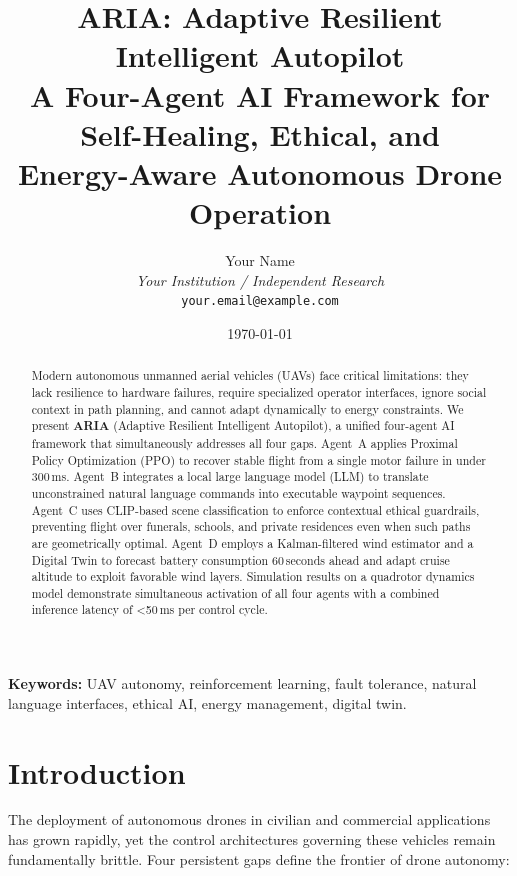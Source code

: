 \documentclass[10pt,twocolumn]{article}
\title{
    \textbf{ARIA: Adaptive Resilient Intelligent Autopilot}\\
    \large A Four-Agent AI Framework for Self-Healing, Ethical, and\\
    Energy-Aware Autonomous Drone Operation
}
\author{
    Your Name\\
    \textit{Your Institution / Independent Research}\\
    \texttt{your.email@example.com}
}
\date{\today}
\begin{document}
\maketitle

\begin{abstract}
Modern autonomous unmanned aerial vehicles (UAVs) face critical
limitations: they lack resilience to hardware failures, require
specialized operator interfaces, ignore social context in path
planning, and cannot adapt dynamically to energy constraints.
We present \textbf{ARIA} (Adaptive Resilient Intelligent Autopilot),
a unified four-agent AI framework that simultaneously addresses all
four gaps. Agent~A applies Proximal Policy Optimization (PPO) to
recover stable flight from a single motor failure in under 300\,ms.
Agent~B integrates a local large language model (LLM) to translate
unconstrained natural language commands into executable waypoint
sequences. Agent~C uses CLIP-based scene classification to enforce
contextual ethical guardrails, preventing flight over funerals,
schools, and private residences even when such paths are
geometrically optimal. Agent~D employs a Kalman-filtered wind
estimator and a Digital Twin to forecast battery consumption
60\,seconds ahead and adapt cruise altitude to exploit favorable
wind layers. Simulation results on a quadrotor dynamics model
demonstrate simultaneous activation of all four agents with a
combined inference latency of \textless{}50\,ms per control cycle.
\end{abstract}

\textbf{Keywords:} UAV autonomy, reinforcement learning, fault
tolerance, natural language interfaces, ethical AI, energy management,
digital twin.

\section{Introduction}
\label{sec:intro}

The deployment of autonomous drones in civilian and commercial
applications has grown rapidly, yet the control architectures
governing these vehicles remain fundamentally brittle. Four
persistent gaps define the frontier of drone autonomy:
\end{document}
